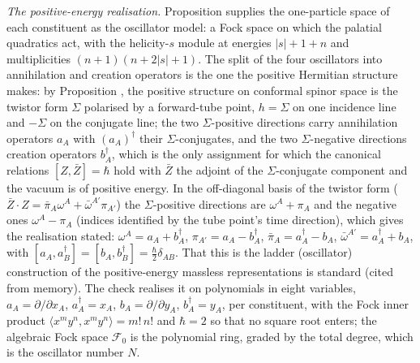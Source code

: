 \emph{The positive-energy realisation.} Proposition  supplies the one-particle space of each constituent as the oscillator model: a Fock space on which the palatial quadratics act, with the helicity-$s$ module at energies $|s| + 1 + n$ and multiplicities $(n+1)(n + 2|s| + 1)$. The split of the four oscillators into annihilation and creation operators is the one the positive Hermitian structure makes: by Proposition , the positive structure on conformal spinor space is the twistor form $\Sigma$ polarised by a forward-tube point, $h = \Sigma$ on one incidence line and $-\Sigma$ on the conjugate line; the two $\Sigma$-positive directions carry annihilation operators $a_{A}$ with $(a_{A})^{\dagger}$ their $\Sigma$-conjugates, and the two $\Sigma$-negative directions creation operators $b^{\dagger}_{A}$, which is the only assignment for which the canonical relations $[Z, \bar{Z}] = \hbar$ hold with $\bar{Z}$ the adjoint of the $\Sigma$-conjugate component and the vacuum is of positive energy. In the off-diagonal basis of the twistor form ($\bar{Z}\cdot Z = \bar{\pi}_{A}\omega^{A} + \bar{\omega}^{A'}\pi_{A'}$) the $\Sigma$-positive directions are $\omega^{A} + \pi_{A}$ and the negative ones $\omega^{A} - \pi_{A}$ (indices identified by the tube point's time direction), which gives the realisation stated: $\omega^{A} = a_{A} + b^{\dagger}_{A}$, $\pi_{A'} = a_{A} - b^{\dagger}_{A}$, $\bar{\pi}_{A} = a^{\dagger}_{A} - b_{A}$, $\bar{\omega}^{A'} = a^{\dagger}_{A} + b_{A}$, with $[a_{A}, a^{\dagger}_{B}] = [b_{A}, b^{\dagger}_{B}] = \tfrac{\hbar}{2}\delta_{AB}$. That this is the ladder (oscillator) construction of the positive-energy massless representations is standard (cited from memory). The check realises it on polynomials in eight variables, $a_{A} = \partial/\partial x_{A}$, $a^{\dagger}_{A} = x_{A}$, $b_{A} = \partial/\partial y_{A}$, $b^{\dagger}_{A} = y_{A}$, per constituent, with the Fock inner product $\langle x^{m}y^{n}, x^{m}y^{n}\rangle = m!\,n!$ and $\hbar = 2$ so that no square root enters; the algebraic Fock space $\mathcal{F}_{0}$ is the polynomial ring, graded by the total degree, which is the oscillator number $N$.

